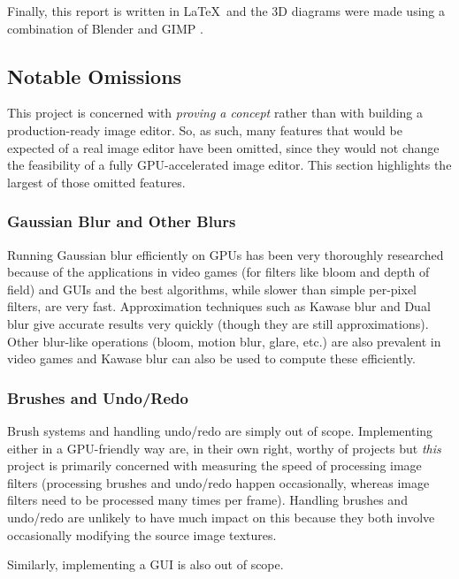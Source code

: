 \documentclass[12pt]{article}
\begin{document}
Finally, this report is written in \LaTeX\ and the 3D diagrams were made using a combination of
Blender \cite{blender} and GIMP \cite{gimp}.

\subsection{Notable Omissions}\label{sec:omissions}

This project is concerned with \emph{proving a concept} rather than with building a production-ready
image editor.  So, as such, many features that would be expected of a real image editor have been
omitted, since they would not change the feasibility of a fully GPU-accelerated image editor.  This
section highlights the largest of those omitted features.

\subsubsection{Gaussian Blur and Other Blurs}

Running Gaussian blur efficiently on GPUs has been very thoroughly researched \cite{fast-blur}
because of the applications in video games (for filters like bloom and depth of field) and GUIs and
the best algorithms, while slower than simple per-pixel filters, are very fast.  Approximation
techniques such as Kawase blur and Dual blur \cite{kawase-blur} give accurate results very quickly
(though they are still approximations).  Other blur-like operations (bloom, motion blur, glare,
etc.) are also prevalent in video games and Kawase blur can also be used to compute these
efficiently.  

\subsubsection{Brushes and Undo/Redo}

Brush systems and handling undo/redo are simply out of scope.  Implementing either in a GPU-friendly
way are, in their own right, worthy of projects but \emph{this} project is primarily concerned with
measuring the speed of processing image filters (processing brushes and undo/redo happen
occasionally, whereas image filters need to be processed many times per frame).  Handling brushes
and undo/redo are unlikely to have much impact on this because they both involve occasionally
modifying the source image textures.

Similarly, implementing a GUI is also out of scope.
\end{document}
